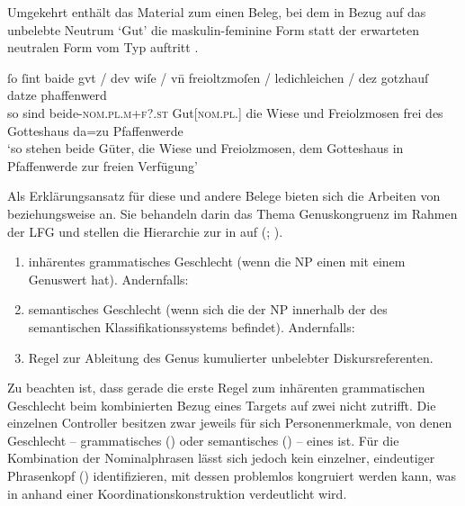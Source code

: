 Umgekehrt enthält das Material zum \CAO{} einen Beleg, bei dem in
Bezug auf das un\-belebte Neutrum  `Gut' die maskulin-feminine
Form  statt der erwarteten neutralen Form vom Typ 
auftritt .

\begin{exe}
\ex\label{ex:1584_gut2}
	\gll ſo ſint baide gvt / dev wiſe / vn̄ freioltzmoſen /
			ledichleichen / dez gotzhauſ datze phaffenwerd \\
		so sind beide-\textsc{nom.pl.m+f?\subI.st} Gut[\textsc{nom.pl.\NeutI}]
			{} die Wiese {} und Freiolzmosen {} frei {} des Gotteshaus da=zu
			Pfaffenwerde \\
	\trans `so stehen beide Güter, die Wiese und Freiolzmosen, dem Gotteshaus
		in Pfaffenwerde zur freien Verfügung'
		\parencites(Nr.~1584, Kl.~Herrenchiemsee, Kr.~Rosenheim, 1292)[727,26--27]{cao2}
\end{exe}

Als Erklärungsansatz für diese und andere Belege bieten sich die Arbeiten von
\citet[171--195]{wechslerzlatic2003} beziehungsweise \citet{wechsler2009} an.
Sie behandeln darin das Thema Genus\-kongruenz im Rahmen der
LFG
\autocites(vgl.~){bresnanetal2016} und stellen die
Hierarchie zur  in  auf (; \cites[584]{wechsler2009}[195]{wechslerzlatic2003}).

\begin{exe}
\ex\label{ex:gendasshier}
	\begin{enumerate}
		\item inhärentes grammatisches Geschlecht (wenn die
			NP einen  mit einem Genuswert
			hat). Andernfalls:
		\item semantisches Geschlecht (wenn sich die  der NP
			innerhalb der  des semantischen Klassifikationssystems
			befindet). Andernfalls:
		\item Regel zur Ableitung des Genus kumulierter
			unbelebter Diskursreferenten.
	\end{enumerate}
\end{exe}

Zu beachten ist, dass gerade die erste Regel zum inhärenten grammatischen
Geschlecht beim kombinierten Bezug eines Targets auf zwei
 nicht zutrifft. Die einzelnen Controller besitzen zwar jeweils
für sich Personenmerkmale, von denen Geschlecht --
grammatisches () oder semantisches () -- eines ist. Für
die Kombination der Nominalphrasen lässt sich jedoch kein
einzelner, eindeutiger Phrasenkopf ()
identifizieren, mit dessen  problemlos
kongruiert werden kann, was in  anhand
einer Koordinations\-konstruktion verdeutlicht wird.


